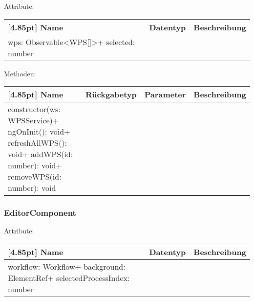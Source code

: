         	    Attribute:
                \begin{center}
                	\renewcommand{\arraystretch}{1.5}
                    \setlength\tabcolsep{5pt}
                	\begin{tabularx}{\textwidth}{|l|l|X|}
                		\hline
                        \rowcolor[gray]{0.75}[4.85pt]            		
                        Name & Datentyp & Beschreibung \\ \hline
                        wps: Observable<WPS[]>+ selected: number
                        & &  \\ \hline
                	\end{tabularx}
                \end{center}
                
                Methoden:
        		\begin{center}
                \setlength\tabcolsep{5pt}
                	\renewcommand{\arraystretch}{1.5}
                    	\begin{tabularx}{\textwidth}{|l|l|l|X|}
                    	\hline
                    	\rowcolor[gray]{0.75}[4.85pt]
                		Name & Rückgabetyp & Parameter & Beschreibung \\ \hline 
                		constructor(ws: WPSService)+ ngOnInit(): void+ refreshAllWPS(): void+ addWPS(id: number): void+ removeWPS(id: number): void
                        & & &  \\ \hline
                        \end{tabularx}
        		\end{center}
        	
        	\subsubsection{EditorComponent}
        	
        	    Attribute:
                \begin{center}
                	\renewcommand{\arraystretch}{1.5}
                    \setlength\tabcolsep{5pt}
                	\begin{tabularx}{\textwidth}{|l|l|X|}
                		\hline
                        \rowcolor[gray]{0.75}[4.85pt]            		
                        Name & Datentyp & Beschreibung \\ \hline
                        workflow: Workflow+ background: ElementRef+ selectedProcessIndex: number
                        & &  \\ \hline
                	\end{tabularx}
                \end{center}
                
